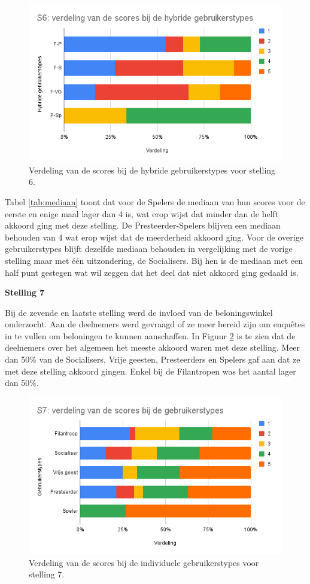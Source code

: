 \begin{figure}
    \includegraphics[width=\linewidth]{S6_Hybride.png}
    \caption{Verdeling van de scores bij de hybride gebruikerstypes voor stelling 6.}
    \label{fig:s6_hybride}
\end{figure}

Tabel \ref{tab:mediaan} toont dat voor de Spelers de mediaan van hun scores voor de eerste en enige maal lager dan 4 is, wat erop wijst dat minder dan de helft akkoord ging met deze stelling. De Presteerder-Spelers blijven een mediaan behouden van 4 wat erop wijst dat de meerderheid akkoord ging. Voor de overige gebruikerstypes blijft dezelfde mediaan behouden in vergelijking met de vorige stelling maar met één uitzondering, de Socialisers. Bij hen is de mediaan met een half punt gestegen wat wil zeggen dat het deel dat niet akkoord ging gedaald is.

\textbf{Stelling 7}

Bij de zevende en laatste stelling werd de invloed van de beloningswinkel onderzocht. Aan de deelnemers werd gevraagd of ze meer bereid zijn om enquêtes in te vullen om beloningen te kunnen aanschaffen. In Figuur \ref{fig:s7} is te zien dat de deelnemers over het algemeen het meeste akkoord waren met deze stelling. Meer dan 50\% van de Socialisers, Vrije geesten, Presteerders en Spelers gaf aan dat ze met deze stelling akkoord gingen. Enkel bij de Filantropen was het aantal lager dan 50\%.

\begin{figure}
    \includegraphics[width=\linewidth]{S7.png}
    \caption{Verdeling van de scores bij de individuele gebruikerstypes voor stelling 7.}
    \label{fig:s7}
\end{figure}

